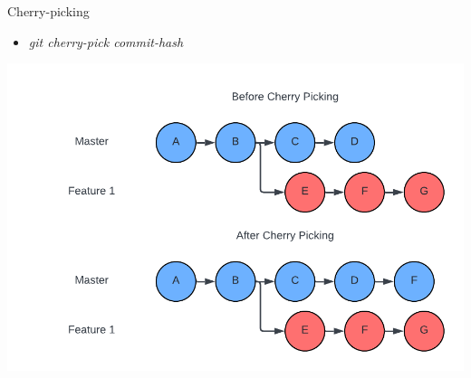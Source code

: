 \documentclass[aspectratio=169]{beamer}
\begin{document}
\begin{frame}{Cherry-picking}
    \begin{itemize}
        \item \textit{git cherry-pick commit-hash}
    \end{itemize}
    \begin{center}
        \includegraphics[scale=.25]{cherry_diagram.png}
    \end{center}
\end{frame}
\end{document}
